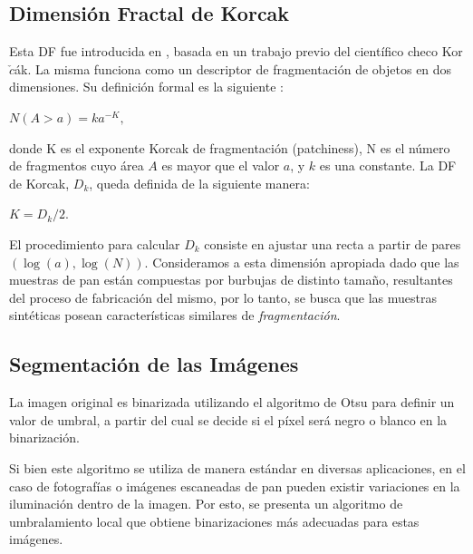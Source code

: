 \subsection{Dimensi\'on Fractal de Korcak}
Esta DF fue introducida en \cite{Mandelbrot1983}, basada en un trabajo previo del cient\'ifico checo Kor$\check{c}$\'ak. La misma funciona como un descriptor de fragmentaci\'on de objetos en dos dimensiones. Su definici\'on formal es la siguiente \cite{Imre11}:

$N(A > a) = k a^{-K},$

\noindent
donde K es el exponente Korcak de fragmentaci\'on (patchiness), N es el n\'umero de fragmentos cuyo \'area $A$ es mayor que el valor $a$, y $k$ es una constante. La DF de Korcak, $D_{k}$, queda definida de la siguiente manera:

$K = D_{k}/2.$

El procedimiento para calcular $D_{k}$ consiste en ajustar una recta a partir de pares $(\log(a),\log(N))$. Consideramos a esta dimensión apropiada dado que las muestras de pan est\'an compuestas por burbujas de distinto tama\~no, resultantes del proceso de fabricación del mismo, por lo tanto, se busca que las muestras sint\'eticas posean caracter\'isticas similares de {\em fragmentaci\'on}.

\subsection{Segmentaci\'on de las Im\'agenes}
La imagen original es binarizada utilizando el algoritmo de Otsu \cite{Otsu79} para definir un valor de umbral, a partir del cual se decide si el p\'ixel ser\'a negro o blanco en la binarizaci\'on. 


Si bien este algoritmo se utiliza de manera estándar en diversas aplicaciones, en el caso de fotografías o imágenes escaneadas de pan pueden existir variaciones en la iluminación dentro de la imagen.
Por esto, se presenta un algoritmo de umbralamiento local que obtiene binarizaciones más adecuadas para estas imágenes. 


